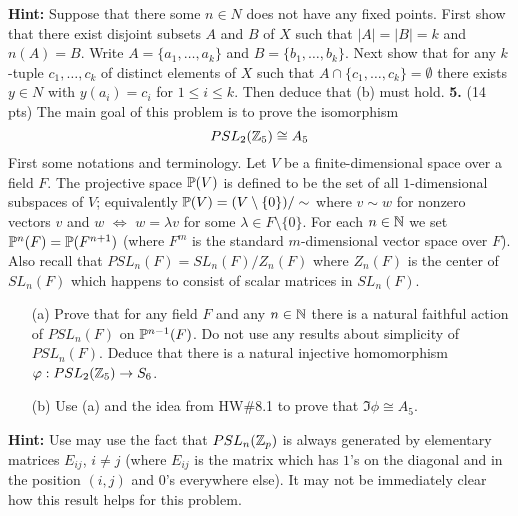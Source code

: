 \documentclass[12pt]{amsart}
\begin{document}
{\bf Hint:} Suppose that there some $n\in N$ does not have any fixed points. First show that there exist disjoint subsets $A$ and $B$
of $X$ such that $|A|=|B|=k$ and $n(A)=B$. Write $A=\{a_1,\ldots, a_k\}$ and $B=\{b_1,\ldots, b_k\}$. Next show that for any $k$-tuple
$c_1,\ldots, c_k$ of distinct elements of $X$ such that $A\cap \{c_1,\ldots, c_k\}=\emptyset$ there exists $y\in N$ with $y(a_i)=c_i$
for $1\leq i\leq k$. Then deduce that (b) must hold. 
\skv
{\bf 5.} (14 pts)  The main goal of this problem is to prove the isomorphism $$PSL_2({\mathbb Z}_5)\cong A_5$$
First some notations and terminology. Let $V$ be a finite-dimensional space over a field $F$. The projective space ${\mathbb P}(V)$ is defined to be the set of all $1$-dimensional subspaces of $V$; equivalently ${\mathbb P}(V)=(V\setminus\{0\})/\sim$ where $v\sim w$ for nonzero vectors $v$ and $w$
$\iff$ $w=\lambda v$ for some $\lambda\in F\setminus\{0\}$. For each $n\in{\mathbb N}$ we set ${\mathbb P}^n(F)={\mathbb P}(F^{n+1})$ (where $F^{m}$ is the standard $m$-dimensional vector space over $F$). Also recall that $PSL_n(F)=SL_n(F)/Z_n(F)$ where $Z_n(F)$ is the center of $SL_n(F)$ which happens to consist 
of scalar matrices in $SL_n(F)$.
\skv
\begin{itemize}
\item[(a)] Prove that for any field $F$ and any $n\in{\mathbb N}$ there is a natural faithful action of $PSL_n(F)$ on ${\mathbb P}^{n-1}(F)$. Do not use any results about simplicity of $PSL_n(F)$. Deduce that there is a natural injective homomorphism ${\varphi}:PSL_2({\mathbb Z}_5)\to S_6$.
\item[(b)] Use (a) and the idea from HW\#8.1 to prove that $\Im\phi\cong A_5$.
\end{itemize}
{\bf Hint:} Use may use the fact that $PSL_n({\mathbb Z}_p)$ is always generated by elementary matrices $E_{ij}$, $i\neq j$ (where $E_{ij}$ is the matrix which has $1$'s on the diagonal and in the position $(i,j)$ and $0$'s everywhere else). It may not be immediately clear how this result helps for this problem. 
\end{document}
